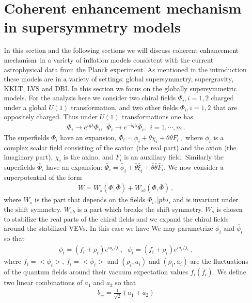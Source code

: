 \documentclass[12pt]{article}
\def\cem{coherent enhancement mechanism~}
\begin{document}
\section{Coherent enhancement mechanism in supersymmetry models}
In this section and the following sections we will discuss \cem in a variety of inflation models consistent with the current astrophysical data
from the Planck experiment. As mentioned in the introduction these models are in a variety of settings:  global supersymmetry, supergravity,
KKLT, LVS and DBI. In this section we focus on the globally supersymmetric models.
For the analysis here we consider two chiral fields $\Phi_i, i=1,2$ charged under a global $U(1)$
transformation, and two other fields $\bar\Phi_i, i=1,2$ that are oppositely charged.
Thus under $U(1)$  transformations one
has
\begin{align}
  \Phi_i\to e^{i q \lambda} \Phi_i, ~~\bar \Phi_i\to e^{-i q \lambda} \bar \Phi_i, ~~i=1, \cdots, m\,.
\end{align}
The superfields ${\Phi}_{i}$ have an expansion,
${\Phi}_{i} = {\phi}_{i} + \theta  {\chi}_{i} + \theta  \theta  {F}_{i}\,,$
where ${\phi}_{i}$ is a complex scalar field consisting of the saxion (the real part) and the axion (the imaginary
part), ${\chi}_{i}$ is the axino, and ${F}_{i}$ is an auxiliary field.
Similarly the superfields $\bar {\Phi}_{i}$ have an expansion:
$\bar {\Phi}_{i} = \bar {\phi}_{i} + \bar \theta  \bar {\xi}_{i} + \bar\theta \bar  \theta  \bar{F}_{i}$.
We now consider a superpotential of the form
\begin{align}
  W = W_s(\Phi,\bar \Phi) + W_ {sb} (\Phi, \bar \Phi)\,,
  \label{wsn}
\end{align}
where $W_s$ is the part that depends on the fields $\Phi_i,  \bar |phi_i$ and is invariant under the shift symmetry.
$W_{sb}$ is a  part which breaks the shift symmetry.  $W_s$ is chosen to stabilize the real parts of the chiral fields
and we expand the chiral fields around the stabilized VEVs. In this case we have
We may parametrize $\phi_i$ and $\bar \phi_i$ so that
\begin{align}
  \phi_i = (f_i + \rho_i) e^{ia_i/f_i}, ~~~\bar\phi_i = (\bar f_i + \bar \rho_i) e^{i\bar a_i/\bar f_i}\,,
\end{align}
where $f_i= <\phi_i> ,~\bar f_i= <\bar\phi_i>$ and  $(\rho_i, a_i)$ and $(\bar \rho_i, \bar a_i)$
are the fluctuations of the quantum fields around their vacuum expectation values  $f_i(\bar f_i)$.
We define two linear combinations of $a_1$ and $a_2$ so that
\begin{align}
  b_{\pm}= \frac{1}{\sqrt 2} (a_1\pm a_2)
  \label{b+b-}
\end{align}
\end{document}
